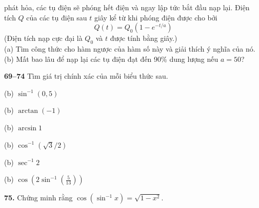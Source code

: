\hfill
\begin{minipage}[t]{0.482\textwidth}
\small
\noindent
phát hỏa, các tụ điện sẽ phóng hết điện và ngay lập tức bắt đầu nạp lại. Điện tích $Q$ của các tụ điện sau $t$ giây kể từ khi phóng điện được cho bởi
\[
Q(t) = Q_0\left(1 - e^{-t/a}\right)
\]
(Điện tích nạp cực đại là $Q_0$ và $t$ được tính bằng giây.)\\
(a) Tìm công thức cho hàm ngược của hàm số này và giải thích ý nghĩa của nó.\\
(b) Mất bao lâu để nạp lại các tụ điện đạt đến 90\% dung lượng nếu $a = 50$?

\par\vspace{1.5mm}\noindent{\color{stewartcyan}\rule{\linewidth}{0.4pt}}\par\vspace{1.5mm}

\noindent\textbf{\textsf{\color{stewartcyan}69--74}} Tìm giá trị chính xác của mỗi biểu thức sau.

\medskip
\noindent
{}(b) $\sin^{-1}(0{,}5)$

\smallskip
\noindent
{}(b) $\arctan(-1)$

\smallskip
\noindent
{}(b) $\arcsin 1$

\smallskip
\noindent
{}(b) $\cos^{-1}(\sqrt{3}/2)$

\smallskip
\noindent
{}(b) $\sec^{-1} 2$

\smallskip
\noindent
{}(b) $\cos\left(2\sin^{-1}\left(\frac{5}{13}\right)\right)$

\par\vspace{1.5mm}\noindent{\color{stewartcyan}\rule{\linewidth}{0.4pt}}\par\vspace{1.5mm}

\noindent\textbf{75.} Chứng minh rằng $\cos(\sin^{-1} x) = \sqrt{1 - x^2}$.

\par\vspace{1.5mm}\noindent{\color{stewartcyan}\rule{\linewidth}{0.4pt}}\par\vspace{1.5mm}


\end{minipage}

